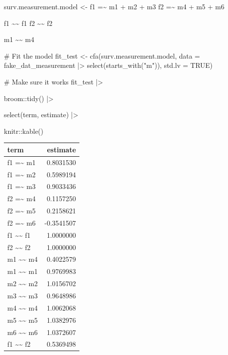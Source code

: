\documentclass[
  letterpaper,
  DIV=11,
  numbers=noendperiod]{scrreprt}
\newenvironment{Shaded}{\begin{snugshade}}{\end{snugshade}}
\newcommand{\AttributeTok}[1]{\textcolor[rgb]{0.40,0.45,0.13}{#1}}
\newcommand{\CommentTok}[1]{\textcolor[rgb]{0.37,0.37,0.37}{#1}}
\newcommand{\ConstantTok}[1]{\textcolor[rgb]{0.56,0.35,0.01}{#1}}
\newcommand{\FunctionTok}[1]{\textcolor[rgb]{0.28,0.35,0.67}{#1}}
\newcommand{\NormalTok}[1]{\textcolor[rgb]{0.00,0.23,0.31}{#1}}
\newcommand{\OtherTok}[1]{\textcolor[rgb]{0.00,0.23,0.31}{#1}}
\newcommand{\SpecialCharTok}[1]{\textcolor[rgb]{0.37,0.37,0.37}{#1}}
\newcommand{\StringTok}[1]{\textcolor[rgb]{0.13,0.47,0.30}{#1}}
\begin{document}
\begin{Shaded}
\begin{Highlighting}[]
\NormalTok{surv.measurement.model }\OtherTok{\textless{}{-}} \StringTok{\textquotesingle{} }
\StringTok{  f1 =\textasciitilde{} m1 + m2 + m3}
\StringTok{  f2 =\textasciitilde{} m4 + m5 + m6}

\StringTok{  f1 \textasciitilde{}\textasciitilde{} f1}
\StringTok{  f2 \textasciitilde{}\textasciitilde{} f2}

\StringTok{  m1 \textasciitilde{}\textasciitilde{} m4}
\StringTok{\textquotesingle{}}

\CommentTok{\# Fit the model}
\NormalTok{fit\_test }\OtherTok{\textless{}{-}} \FunctionTok{cfa}\NormalTok{(surv.measurement.model, }\AttributeTok{data =}\NormalTok{ fake\_dat\_measurement }\SpecialCharTok{|\textgreater{}} \FunctionTok{select}\NormalTok{(}\FunctionTok{starts\_with}\NormalTok{(}\StringTok{"m"}\NormalTok{)), }\AttributeTok{std.lv =} \ConstantTok{TRUE}\NormalTok{)}

\CommentTok{\# Make sure it works}
\NormalTok{fit\_test }\SpecialCharTok{|\textgreater{}} 

\NormalTok{  broom}\SpecialCharTok{::}\FunctionTok{tidy}\NormalTok{() }\SpecialCharTok{|\textgreater{}}

  \FunctionTok{select}\NormalTok{(term, estimate) }\SpecialCharTok{|\textgreater{}}

\NormalTok{  knitr}\SpecialCharTok{::}\FunctionTok{kable}\NormalTok{()}
\end{Highlighting}
\end{Shaded}

\begin{longtable}[]{@{}lr@{}}
\toprule()
term & estimate \\
\midrule()
\endhead
f1 =\textasciitilde{} m1 & 0.8031530 \\
f1 =\textasciitilde{} m2 & 0.5989194 \\
f1 =\textasciitilde{} m3 & 0.9033436 \\
f2 =\textasciitilde{} m4 & 0.1157250 \\
f2 =\textasciitilde{} m5 & 0.2158621 \\
f2 =\textasciitilde{} m6 & -0.3541507 \\
f1 \textasciitilde\textasciitilde{} f1 & 1.0000000 \\
f2 \textasciitilde\textasciitilde{} f2 & 1.0000000 \\
m1 \textasciitilde\textasciitilde{} m4 & 0.4022579 \\
m1 \textasciitilde\textasciitilde{} m1 & 0.9769983 \\
m2 \textasciitilde\textasciitilde{} m2 & 1.0156702 \\
m3 \textasciitilde\textasciitilde{} m3 & 0.9648986 \\
m4 \textasciitilde\textasciitilde{} m4 & 1.0062068 \\
m5 \textasciitilde\textasciitilde{} m5 & 1.0382976 \\
m6 \textasciitilde\textasciitilde{} m6 & 1.0372607 \\
f1 \textasciitilde\textasciitilde{} f2 & 0.5369498 \\
\bottomrule()
\end{longtable}
\end{document}
